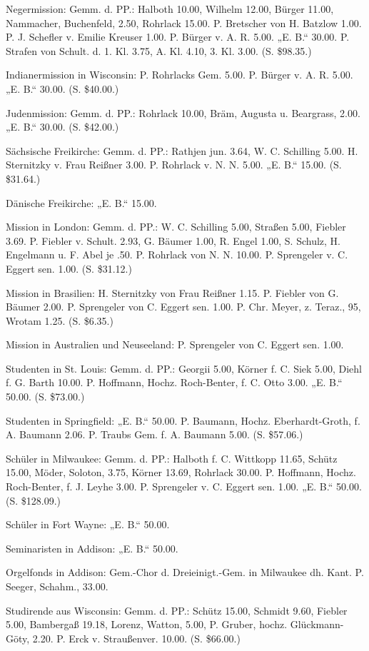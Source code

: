 Negermission: Gemm. d. PP.: Halboth 10.00, Wilhelm 12.00, Bürger 11.00, Nammacher, Buchenfeld, 2.50, Rohrlack 15.00. P. Bretscher von H. Batzlow 1.00. P. J. Schefler v. Emilie Kreuser 1.00. P. Bürger v. A. R. 5.00. „E. B.“ 30.00. P. Strafen von Schult. d. 1. Kl. 3.75, A. Kl. 4.10, 3. Kl. 3.00. (S. \$98.35.)

Indianermission in Wisconsin: P. Rohrlacks Gem. 5.00. P. Bürger v. A. R. 5.00. „E. B.“ 30.00. (S. \$40.00.)

Judenmission: Gemm. d. PP.: Rohrlack 10.00, Bräm, Augusta u. Beargrass, 2.00. „E. B.“ 30.00. (S. \$42.00.)

Sächsische Freikirche: Gemm. d. PP.: Rathjen jun. 3.64, W. C. Schilling 5.00. H. Sternitzky v. Frau Reißner 3.00. P. Rohrlack v. N. N. 5.00. „E. B.“ 15.00. (S. \$31.64.)

Dänische Freikirche: „E. B.“ 15.00.

Mission in London: Gemm. d. PP.: W. C. Schilling 5.00, Straßen 5.00, Fiebler 3.69. P. Fiebler v. Schult. 2.93, G. Bäumer 1.00, R. Engel 1.00, S. Schulz, H. Engelmann u. F. Abel je .50. P. Rohrlack von N. N. 10.00. P. Sprengeler v. C. Eggert sen. 1.00. (S. \$31.12.)

Mission in Brasilien: H. Sternitzky von Frau Reißner 1.15. P. Fiebler von G. Bäumer 2.00. P. Sprengeler von C. Eggert sen. 1.00. P. Chr. Meyer, z. Teraz., 95, Wrotam 1.25. (S. \$6.35.)

Mission in Australien und Neuseeland: P. Sprengeler von C. Eggert sen. 1.00.

Studenten in St. Louis: Gemm. d. PP.: Georgii 5.00, Körner f. C. Siek 5.00, Diehl f. G. Barth 10.00. P. Hoffmann, Hochz. Roch-Benter, f. C. Otto 3.00. „E. B.“ 50.00. (S. \$73.00.)

Studenten in Springfield: „E. B.“ 50.00. P. Baumann, Hochz. Eberhardt-Groth, f. A. Baumann 2.06. P. Traubs Gem. f. A. Baumann 5.00. (S. \$57.06.)

Schüler in Milwaukee: Gemm. d. PP.: Halboth f. C. Wittkopp 11.65, Schütz 15.00, Möder, Soloton, 3.75, Körner 13.69, Rohrlack 30.00. P. Hoffmann, Hochz. Roch-Benter, f. J. Leyhe 3.00. P. Sprengeler v. C. Eggert sen. 1.00. „E. B.“ 50.00. (S. \$128.09.)

Schüler in Fort Wayne: „E. B.“ 50.00.

Seminaristen in Addison: „E. B.“ 50.00.

Orgelfonds in Addison: Gem.-Chor d. Dreieinigt.-Gem. in Milwaukee dh. Kant. P. Seeger, Schahm., 33.00.

Studirende aus Wisconsin: Gemm. d. PP.: Schütz 15.00, Schmidt 9.60, Fiebler 5.00, Bambergaß 19.18, Lorenz, Watton, 5.00, P. Gruber, hochz. Glückmann-Göty, 2.20. P. Erck v. Straußenver. 10.00. (S. \$66.00.)


